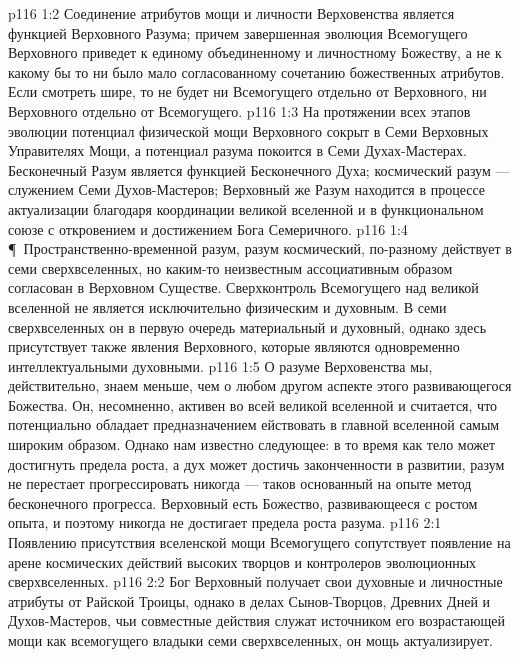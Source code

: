 \vs p116 1:2 Соединение атрибутов мощи и личности Верховенства является функцией Верховного Разума; причем завершенная эволюция Всемогущего Верховного приведет к единому объединенному и личностному Божеству, а не к какому бы то ни было мало согласованному сочетанию божественных атрибутов. Если смотреть шире, то не будет ни Всемогущего отдельно от Верховного, ни Верховного отдельно от Всемогущего.
\vs p116 1:3 На протяжении всех этапов эволюции потенциал физической мощи Верховного сокрыт в Семи Верховных Управителях Мощи, а потенциал разума покоится в Семи Духах\hyp{}Мастерах. Бесконечный Разум является функцией Бесконечного Духа; космический разум --- служением Семи Духов\hyp{}Мастеров; Верховный же Разум находится в процессе актуализации благодаря координации великой вселенной и в функциональном союзе с откровением и достижением Бога Семеричного.
\vs p116 1:4 \P\ Пространственно\hyp{}временной разум, разум космический, по\hyp{}разному действует в семи сверхвселенных, но каким\hyp{}то неизвестным ассоциативным образом согласован в Верховном Существе. Сверхконтроль Всемогущего над великой вселенной не является исключительно физическим и духовным. В семи сверхвселенных он в первую очередь материальный и духовный, однако здесь присутствует также явления Верховного, которые являются одновременно интеллектуальными духовными.
\vs p116 1:5 О разуме Верховенства мы, действительно, знаем меньше, чем о любом другом аспекте этого развивающегося Божества. Он, несомненно, активен во всей великой вселенной и считается, что потенциально обладает предназначением ействовать в главной вселенной самым широким образом. Однако нам известно следующее: в то время как тело может достигнуть предела роста, а дух может достичь законченности в развитии, разум не перестает прогрессировать никогда --- таков основанный на опыте метод бесконечного прогресса. Верховный есть Божество, развивающееся с ростом опыта, и поэтому никогда не достигает предела роста разума.
\vs p116 2:1 Появлению присутствия вселенской мощи Всемогущего сопутствует появление на арене космических действий высоких творцов и контролеров эволюционных сверхвселенных.
\vs p116 2:2 Бог Верховный получает свои духовные и личностные атрибуты от Райской Троицы, однако в делах Сынов\hyp{}Творцов, Древних Дней и Духов\hyp{}Мастеров, чьи совместные действия служат источником его возрастающей мощи как всемогущего владыки семи сверхвселенных, он мощь актуализирует.
